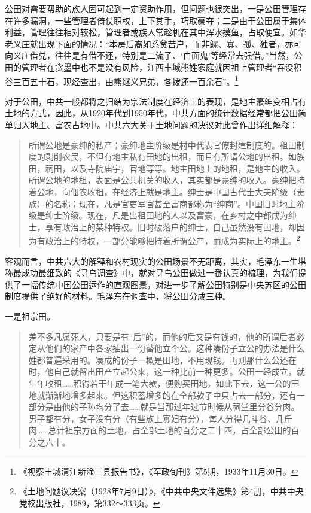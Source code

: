 公田对需要帮助的族人固可起到一定资助作用，但问题也很突出，一是公田管理存在许多漏洞，一些管理者倚仗职权，上下其手，巧取豪夺；二是由于公田属于集体利益，管理往往相对较松，管理者或族人常趁机在其中浑水摸鱼，占取便宜。如华老义庄就出现下面的情况：“本房后裔如系贫苦户，而非鳏、寡、孤、独者，亦可向义庄借兑，往往是有借不还，特别是二流子、‘白面鬼’等经常去强借。”当然，公田的管理者在贪墨中也不是没有风险，江西丰城熊姓家庭就因祖上管理者“吞没积谷三百五十石，现经查出，由熊继义兄弟，各拨还一百余石”。\footnote{《视察丰城清江新淦三县报告书》，《军政旬刊》第5期，1933年11月30日。}


对于公田，中共一般都将之归结为宗法制度在经济上的表现，是地主豪绅变相占有土地的方式，因此，从1920年代到1950年代，中共方面的统计数据经常都把公田简单归入地主、富农占地中。中共六大关于土地问题的决议对此曾作出详细解释：

\begin{quote}

所谓公地是豪绅的私产；豪绅地主阶级是村中代表官僚封建制度的。租田制度的剥削农民，不但有地主私有田地的出租，而且有所谓公地的出租。如族田，祠田，以及寺院庙宇，官地等等。地主田地上的地租，是地主的收入。所谓公地的地租，表面是公共机关的收入，其实都是豪绅的收入。豪绅把持着公地，向佃农收租，在经济上就是地主。绅士是中国古代士大夫阶级（贵族）的名称；现在，凡是官吏军官甚至富商都称为“绅商”。中国旧时地主阶级是绅士阶级。现在，凡是出租田地的人以及富豪，在乡村之中都成为绅士，享有政治上的某种特权。旧时破落户的绅士，自己虽然没有田地，却因为有政治上的特权，一部分能够把持着所谓公产，而成为实际上的地主。\footnote{《土地问题议决案（1928年7月9日）》，《中共中央文件选集》第4册，中共中央党校出版社，1989，第332～333页。}
\end{quote}


客观而言，中共六大的解释和农村现实的公田场景不无距离，其实，毛泽东一生堪称最成功最细致的《寻乌调查》中，就对寻乌公田做过一番认真的梳理，为我们提供了一幅传统中国公田运作的直观图景，对进一步了解公田特别是中央苏区的公田制度提供了绝好的材料。毛泽东在调查中，将公田分成三种。


一是祖宗田。

\begin{quote}

差不多凡属死人，只要是有“后”的，而他的后又是有钱的，他的所谓后者必定从他们的家产中各家抽出一份替他立个公。这种凑份子立公的办法是什么姓都普遍采用的。凑成的份子一概是田地，不用现钱。再则那什么公还在时，他自己就留出田产立起公来，这一种比前一种更多。公田一经成立，就年年收租……积得若干年成一笔大款，便购买田地。如此下去，这一公的田地就渐渐地增多起来。但这积蓄增多的在全部款子中只占去一部分，还有一部分是由他的子孙均分了去……就是当那过年过节时候从祠堂里分谷分肉。男子都有分，女子没有分（有些族上寡妇有分），每人分得几斗谷、几斤肉……总计祖宗方面的土地，占全部土地的百分之二十四，占全部公田的百分之六十。
\end{quote}


